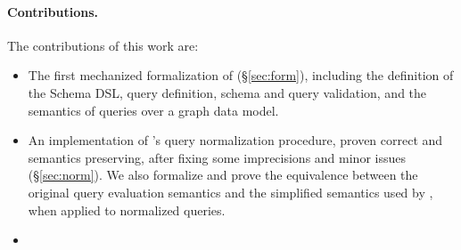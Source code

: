 





\paragraph{Contributions.}
The contributions of this work are:
\begin{itemize}
    \item The first mechanized formalization of \gql (\S\ref{sec:form}), including the definition of the Schema DSL, query definition, schema and query validation, and the semantics of queries over a graph data model.
    \item An implementation of \HP's query normalization procedure, proven correct and semantics preserving, after fixing some imprecisions and minor issues (\S\ref{sec:norm}). We also formalize and prove the equivalence between the original query evaluation semantics and the simplified semantics used by \HP, when applied to normalized queries.
    \item {}
\end{itemize}

